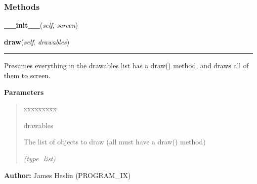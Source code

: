   \subsubsection{Methods}

    \label{pystroke:draw_engine:DrawEngine:__init__}

    \vspace{0.5ex}

\hspace{.8\funcindent}\begin{boxedminipage}{\funcwidth}

    \raggedright \textbf{\_\_init\_\_}(\textit{self}, \textit{screen})

\setlength{\parskip}{2ex}
\setlength{\parskip}{1ex}
    \end{boxedminipage}

    \label{pystroke:draw_engine:DrawEngine:draw}

    \vspace{0.5ex}

\hspace{.8\funcindent}\begin{boxedminipage}{\funcwidth}

    \raggedright \textbf{draw}(\textit{self}, \textit{drawables})

    \vspace{-1.5ex}

    \rule{\textwidth}{0.5\fboxrule}
\setlength{\parskip}{2ex}
    Presumes everything in the drawables list has a draw() method, and 
    draws all of them to screen.

\setlength{\parskip}{1ex}
      \textbf{Parameters}
      \vspace{-1ex}

      \begin{quote}
        \begin{Ventry}{xxxxxxxxx}

          \item[drawables]

          The list of objects to draw (all must have a draw() method)

            {\it (type=list)}

        \end{Ventry}

      \end{quote}

\textbf{Author:} James Heslin (PROGRAM\_IX)



    \end{boxedminipage}

